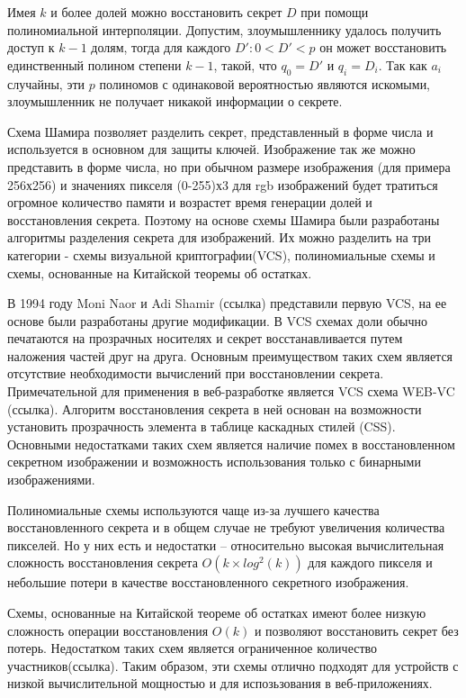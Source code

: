\documentclass[a4paper,article,14pt]{extarticle}
\begin{document}
Имея $k$ и более долей можно восстановить секрет $D$ при помощи полиномиальной интерполяции.
Допустим, злоумышленнику удалось получить доступ к $k-1$ долям, тогда для каждого $D': 0<D'<p$ он может восстановить единственный полином степени $k-1$, такой, что $q_0=D'$ и 
$q_i=D_i$. Так как $a_i$ случайны, эти $p$ полиномов с одинаковой вероятностью являются искомыми, злоумышленник не получает никакой
информации о секрете. 

Схема Шамира позволяет разделить секрет, представленный в форме числа и используется в основном для защиты ключей. Изображение так же 
можно представить в форме числа, но при обычном размере изображения (для примера 256х256) и значениях пикселя (0-255)х3 для rgb изображений
будет тратиться огромное количество памяти и возрастет время генерации долей и восстановления секрета. Поэтому на основе схемы Шамира были разработаны алгоритмы разделения секрета для изображений. 
Их можно разделить на три категории - схемы визуальной криптографии(VCS), полиномиальные схемы и схемы, основанные на Китайской теоремы об остатках. 

В 1994 году Moni Naor и Adi Shamir (ссылка) представили первую VCS, на ее основе были разработаны другие модификации.
В VCS схемах доли обычно печатаются на прозрачных носителях и секрет восстанавливается путем наложения частей друг на друга. 
Основным преимуществом таких схем является отсутствие необходимости вычислений при восстановлении секрета.
Примечательной для применения в веб-разработке является VCS схема WEB-VC (ссылка). Алгоритм восстановления секрета в ней основан 
на возможности установить прозрачность элемента в таблице каскадных стилей (CSS). Основными недостатками таких схем является 
наличие помех в восстановленном секретном изображении и возможность использования только с бинарными изображениями.

Полиномиальные схемы используются чаще из-за лучшего качества восстановленного секрета и в общем случае 
не требуют увеличения количества пикселей. Но у них есть и недостатки -- относительно высокая вычислительная сложность 
восстановления секрета $O(k \times log^2(k))$ для каждого пикселя и небольшие потери в качестве восстановленного секретного изображения.

Схемы, основанные на Китайской теореме об остатках имеют более низкую сложность операции восстановления $O(k)$ и позволяют 
восстановить секрет без потерь. Недостатком таких схем является ограниченное количество участников(ссылка). Таким образом, 
эти схемы отлично подходят для устройств с низкой вычислительной мощностью и для испозьзования в веб-приложениях.
\end{document}
